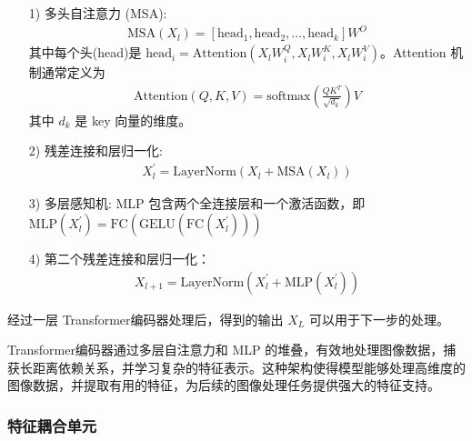 \documentclass[a4paper]{ctexart}
\begin{document}
\begin{itemize}
	\item[1)] 
	多头自注意力 (MSA):
	\begin{equation}
		\begin{aligned}
			\text{MSA}(X_l) = [\text{head}_1, \text{head}_2, \ldots, \text{head}_k] W^{O}
		\end{aligned}
		\label{eq: MSA}
	\end{equation}
	其中每个头(head)是 $\text{head}_i = \text{Attention}\left(X_l W_i^Q, X_l W_i^K, X_l W_i^V \right)$。Attention 机制通常定义为
	\begin{equation}
		\begin{aligned}
			\text{Attention}(Q, K, V) = \text{softmax} \left(\frac{QK^T}{\sqrt{d_k}} \right) V
		\end{aligned}
		\label{eq: Attention}
	\end{equation}
	其中 $d_k$ 是 key 向量的维度。
		
	\item[2)]
	残差连接和层归一化:
	\begin{equation}
		\begin{aligned}
			X_l^\prime = \text{LayerNorm} \left(X_l + \text{MSA}(X_l)\right)
		\end{aligned}
		\label{eq: Residual Connection}
	\end{equation}
	
	\item[3)]
	多层感知机:
	MLP 包含两个全连接层和一个激活函数，即 $\text{MLP} (X_l^\prime) = \text{FC}\left(\text{GELU}\left(\text{FC}(X_l^\prime)\right)\right)$
		
	\item[4)]
	第二个残差连接和层归一化：
	\begin{equation}
		\begin{aligned}
			\displaystyle X_{l+1} = \text{LayerNorm} (X_l^\prime + \text{MLP}(X_l^\prime))
		\end{aligned}
		\label{eq: layernorm}
	\end{equation}
\end{itemize}
	
经过一层 Transformer编码器处理后，得到的输出 $X_L$ 可以用于下一步的处理。
	
Transformer编码器通过多层自注意力和 MLP 的堆叠，有效地处理图像数据，捕获长距离依赖关系，并学习复杂的特征表示。这种架构使得模型能够处理高维度的图像数据，并提取有用的特征，为后续的图像处理任务提供强大的特征支持。
	
\subsubsection{特征耦合单元}
\end{document}

